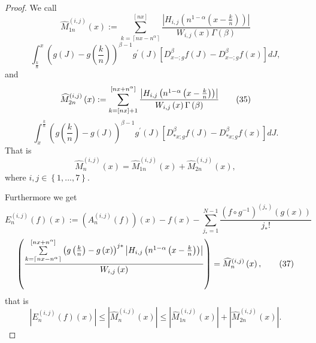 \documentclass[10pt]{NSP1}
\numberwithin{equation}{section}
\begin{document}
\begin{proof}
We call
\begin{equation}
\widehat{M}_{1n}^{\left( i,j\right) }\left( x\right) :=\sum_{k=\left \lceil
nx-n^{\alpha }\right \rceil }^{\left[ nx\right] }\frac{\left \vert
H_{i,j}\left( n^{1-\alpha }\left( x-\frac{k}{n}\right) \right) \right \vert
}{W_{i,j}\left( x\right) \Gamma \left( \beta \right) }  \tag{34}  \label{34}
\end{equation}
\begin{equation*}
\int_{\frac{k}{n}}^{x}\left( g\left( J\right) -g\left( \frac{k}{n}\right)
\right) ^{\beta -1}g^{\prime }\left( J\right) \left[ D_{x-;g}^{\beta
}f\left( J\right) -D_{x-;g}^{\beta }f\left( x\right) \right] dJ,
\end{equation*}
and
\begin{equation}
\widehat{M}_{2n}^{\left( i,j\right) }\left( x\right) :=\sum_{k=\left[ nx%
\right] +1}^{\left[ nx+n^{\alpha }\right] }\frac{\left \vert H_{i,j}\left(
n^{1-\alpha }\left( x-\frac{k}{n}\right) \right) \right \vert }{%
W_{i,j}\left( x\right) \Gamma \left( \beta \right) }  \tag{35}  \label{35}
\end{equation}
\begin{equation*}
\int_{x}^{\frac{k}{n}}\left( g\left( \frac{k}{n}\right) -g\left( J\right)
\right) ^{\beta -1}g^{\prime }\left( J\right) \left[ D_{\ast x;g}^{\beta
}f\left( J\right) -D_{\ast x;g}^{\beta }f\left( x\right) \right] dJ.
\end{equation*}
That is
\begin{equation}
\widehat{M}_{n}^{\left( i,j\right) }\left( x\right) =\widehat{M}%
_{1n}^{\left( i,j\right) }\left( x\right) +\widehat{M}_{2n}^{\left(
i,j\right) }\left( x\right) ,  \tag{36}  \label{36}
\end{equation}
where $i,j\in \left \{ 1,...,7\right \} .$

Furthermore we get
\begin{equation*}
E_{n}^{\left( i,j\right) }\left( f\right) \left( x\right) :=\left(
A_{n}^{\left( i,j\right) }\left( f\right) \right) \left( x\right) -f\left(
x\right) -\sum_{j_{\ast }=1}^{N-1}\frac{\left( f\circ g^{-1}\right) ^{\left(
j_{\ast }\right) }\left( g\left( x\right) \right) }{j_{\ast }!}
\end{equation*}
\begin{equation}
\left( \frac{\sum \limits_{k=\left \lceil nx-n^{\alpha }\right \rceil }^{%
\left[ nx+n^{\alpha }\right] }\left( g\left( \frac{k}{n}\right) -g\left(
x\right) \right) ^{j\ast }\left \vert H_{i,j}\left( n^{1-\alpha }\left( x-%
\frac{k}{n}\right) \right) \right \vert }{W_{i,j}\left( x\right) }\right) =%
\widehat{M}_{n}^{\left( i,j\right) }\left( x\right) ,  \tag{37}  \label{37}
\end{equation}
that is
\begin{equation}
\left \vert E_{n}^{\left( i,j\right) }\left( f\right) \left( x\right) \right
\vert \leq \left \vert \widehat{M}_{n}^{\left( i,j\right) }\left( x\right)
\right \vert \leq \left \vert \widehat{M}_{1n}^{\left( i,j\right) }\left(
x\right) \right \vert +\left \vert \widehat{M}_{2n}^{\left( i,j\right)
}\left( x\right) \right \vert .  \tag{38}  \label{38}
\end{equation}


\end{proof}
\end{document}
